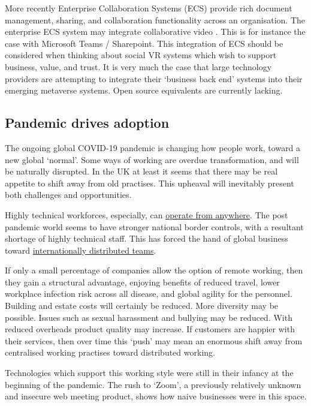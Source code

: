 More recently Enterprise Collaboration Systems (ECS) provide rich document management, sharing, and collaboration functionality across an organisation. The enterprise ECS system may integrate collaborative video \cite{prakash2020characteristic}. This is for instance the case with Microsoft Teams / Sharepoint. This integration of ECS should be considered when thinking about social VR systems which wish to support business, value, and trust. It is very much the case that large technology providers are attempting to integrate their `business back end' systems into their emerging metaverse systems. Open source equivalents are currently lacking.
\subsection{Pandemic drives adoption}
The ongoing global COVID-19 pandemic is changing how people work, toward a new global `normal'. Some ways of working are overdue transformation, and will be naturally disrupted. In the UK at least it seems that there may be real appetite to shift away from old practises. This upheaval will inevitably present both challenges and opportunities.\par
Highly technical workforces, especially, can \href{https://globalworkplaceanalytics.com/telecommuting-statistics}{operate from anywhere}. The post pandemic world seems to have stronger national border controls, with a resultant shortage of highly technical staff. This has forced the hand of global business toward \href{https://www.lifeatspotify.com/being-here/work-from-anywhere}{internationally distributed teams}. \par
If only a small percentage of companies allow the option of remote working, then they gain a structural advantage, enjoying benefits of reduced travel, lower workplace infection risk across all disease, and global agility for the personnel. Building and estate costs will certainly be reduced. More diversity may be possible. Issues such as sexual harassment and bullying may be reduced.  With reduced overheads product quality may increase. If customers are happier with their services, then over time this `push' may mean an enormous shift away from centralised working practises toward distributed working. \par
Technologies which support this working style were still in their infancy at the beginning of the pandemic. The rush to `Zoom', a previously relatively unknown and insecure \cite{aiken2020zooming} web meeting product, shows how naive businesses were in this space. \par
